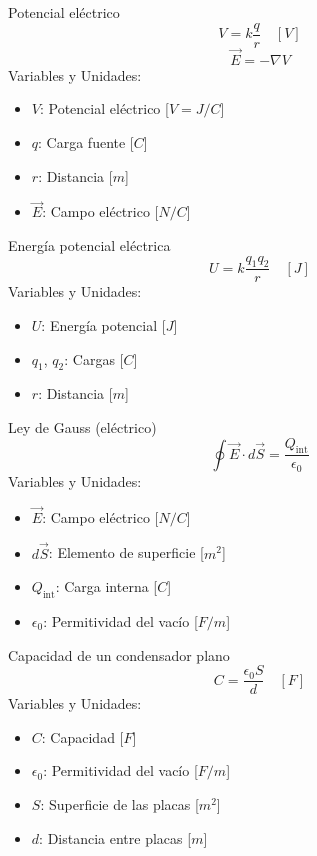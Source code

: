 \begin{landscape}
\begin{multicols}{3}
\begin{teorema}{Potencial eléctrico}
    $$V = k\frac{q}{r} \quad [V]$$
    $$\vec{E} = -\nabla V$$
    Variables y Unidades:
    \begin{itemize}
        \item $V$: Potencial eléctrico [$V = J/C$]
        \item $q$: Carga fuente [$C$]
        \item $r$: Distancia [$m$]
        \item $\vec{E}$: Campo eléctrico [$N/C$]
    \end{itemize}
\end{teorema}

\begin{teorema}{Energía potencial eléctrica}
    $$U = k\frac{q_1 q_2}{r} \quad [J]$$
    Variables y Unidades:
    \begin{itemize}
        \item $U$: Energía potencial [$J$]
        \item $q_1$, $q_2$: Cargas [$C$]
        \item $r$: Distancia [$m$]
    \end{itemize}
\end{teorema}

\columnbreak

\begin{teorema}{Ley de Gauss (eléctrico)}
    $$\oint \vec{E} \cdot d\vec{S} = \frac{Q_{\text{int}}}{\epsilon_0}$$
    Variables y Unidades:
    \begin{itemize}
        \item $\vec{E}$: Campo eléctrico [$N/C$]
        \item $d\vec{S}$: Elemento de superficie [$m^2$]
        \item $Q_{\text{int}}$: Carga interna [$C$]
        \item $\epsilon_0$: Permitividad del vacío [$F/m$]
    \end{itemize}
\end{teorema}

\begin{teorema}{Capacidad de un condensador plano}
    $$C = \frac{\epsilon_0 S}{d} \quad [F]$$
    Variables y Unidades:
    \begin{itemize}
        \item $C$: Capacidad [$F$]
        \item $\epsilon_0$: Permitividad del vacío [$F/m$]
        \item $S$: Superficie de las placas [$m^2$]
        \item $d$: Distancia entre placas [$m$]
    \end{itemize}
\end{teorema}


\end{multicols}
\end{landscape}
